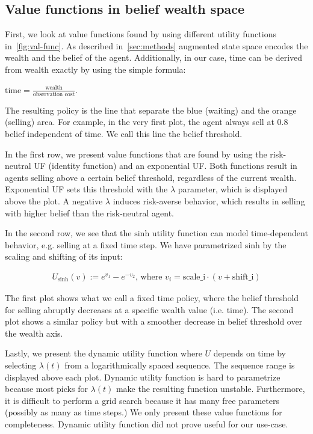 % 


\subsection{Value functions in belief wealth space}\label{ssec:val-func}

First, we look at value functions found by using different utility functions in~\autoref{fig:val-func}.
As described in~\autoref{sec:methods} augmented state space encodes the wealth and the belief of the agent. 
Additionally, in our case, time can be derived from wealth exactly by using the simple formula:

\begin{math}
\text{time} = \frac{\text{wealth}}{\text{observation\ cost}}.
\end{math}

The resulting policy is the line that separate the blue (waiting) and the orange (selling) area. For example, in the very first plot, the agent always sell at 0.8 belief independent of time. We call this line the belief threshold.

In the first row, we present value functions that are found by using the risk-neutral UF (identity function) and an exponential UF. Both functions result in agents selling above a certain belief threshold, regardless of the current wealth.
Exponential UF sets this threshold with the $\lambda$ parameter, which is displayed above the plot.
A negative $\lambda$ induces risk-averse behavior, which results in selling with higher belief than the risk-neutral agent.

In the second row, we see that the $\text{sinh}$ utility function can model time-dependent behavior, e.g. selling at a fixed time step. We have parametrized $\text{sinh}$ by the scaling and shifting of its input:

\begin{align*}
    U_\text{sinh}(v) := e^{v_1} - e^{-v_2} \text{, where\ } v_i = \text{scale_i}\cdot(v+\text{shift_i})
\end{align*}

The first plot shows what we call a fixed time policy, where the belief threshold for selling abruptly decreases at a specific wealth value (i.e. time).
The second plot shows a similar policy but with a smoother decrease in belief threshold over the wealth axis.

Lastly, we present the dynamic utility function where $U$ depends on time by selecting $\lambda(t)$ from a logarithmically spaced sequence. The sequence range is displayed above each plot. Dynamic utility function is hard to parametrize because most picks for $\lambda(t)$ make the resulting function unstable. Furthermore, it is difficult to perform a grid search because it has many free parameters (possibly as many as time steps.) We only present these value functions for completeness. Dynamic utility function did not prove useful for our use-case.

